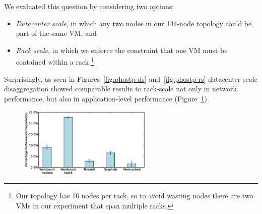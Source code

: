We evaluated this question by considering two options:
\begin{itemize}
\item \emph{Datacenter scale}, in which any two nodes in our 144-node topology could be part of the same VM, and
\item \emph{Rack scale}, in which we enforce the constraint that one VM must be contained within a rack \footnote{Our topology has 16 nodes per rack, so to avoid wasting nodes there are two VMs in our experiment that span multiple racks.}
\end{itemize}

Surprisingly, as seen in Figures~\ref{fig:phostp-ds} and~\ref{fig:phostp-rs} datacenter-scale disaggregation showed comparable results to rack-scale not only in network performance, but also in application-level performance (Figure~\ref{fig:appfabric}).

%
\begin{figure}
  \centering
    \includegraphics[width = 2.5in]{img/slowdown.eps} 
  \caption{\small{}}
  \label{fig:appfabric}
\end{figure}
%


%


